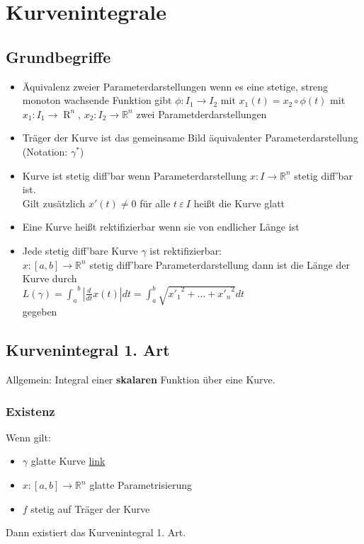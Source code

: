 \section{Kurvenintegrale}
\subsection{Grundbegriffe}
\begin{itemize}
    \item Äquivalenz zweier Parameterdarstellungen wenn es eine stetige, streng monoton wachsende Funktion gibt $\phi: I_1 \rightarrow I_2$ mit $x_1(t) = x_2 \circ \phi(t)$ mit $x_1: I_1 \rightarrow \mathop{R}^n$, $x_2: I_2 \rightarrow \mathbb{R}^n$ zwei Parametderdarstellungen
    \item Träger der Kurve ist das gemeinsame Bild äquivalenter Parameterdarstellung (Notation: $\gamma^*$)
    \item \label{GlatteKurveDef}Kurve ist stetig diff'bar wenn Parameterdarstellung $x: I \rightarrow \mathbb{R}^n$ stetig diff'bar ist.\\
    Gilt zusätzlich $x'(t) \neq 0$ für alle $t \ \varepsilon \ I$ heißt die Kurve glatt
    \item Eine Kurve heißt rektifizierbar wenn sie von endlicher Länge ist
    \item Jede stetig diff'bare Kurve $\gamma$ ist rektifizierbar:\\
    $x: [a,b] \rightarrow \mathbb{R}^n$ stetig diff'bare Parameterdarstellung dann ist die Länge der Kurve durch \\
    $L(\gamma) = {\int_{a}}^{b} |\frac{d}{dt}x(t)|dt = \int_{a}^{b} \sqrt{{x'_{1}}^2+\dots+{x'_{n}}^2}dt$\\
    gegeben
\end{itemize}

\subsection{Kurvenintegral 1. Art}
Allgemein: Integral einer \textbf{skalaren} Funktion über eine Kurve.

\subsubsection{Existenz}

Wenn gilt:
\begin{itemize}
    \item $\gamma$ glatte Kurve \hyperref[GlatteKurveDef]{link}
    \item $x: [a,b] \rightarrow \mathbb{R}^n$ glatte Parametrisierung
    \item $f$ stetig auf Träger der Kurve
\end{itemize}
Dann existiert das Kurvenintegral 1. Art.

